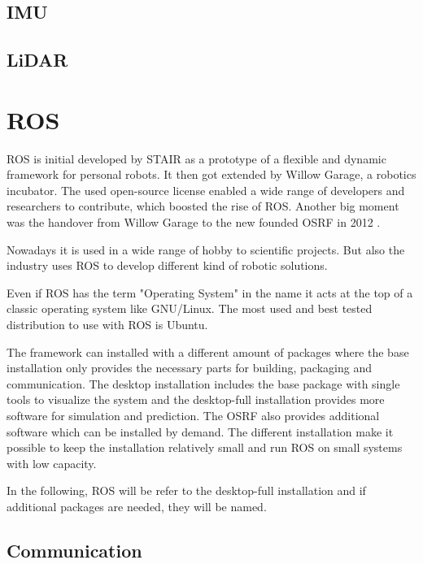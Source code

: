 	\subsection{IMU}\label{ssec:HWIMU}

	\subsection{LiDAR}\label{ssec:HWLiDAR}

\section{ROS}\label{sec:ros}
\ac{ROS} is initial developed by \ac{STAIR} as a prototype of a flexible and dynamic framework for personal robots.
It then got extended by Willow Garage, a robotics incubator.
The used open-source license enabled a wide range of developers and researchers to contribute, which boosted the rise of \ac{ROS}.
Another big moment was the handover from Willow Garage to the new founded \ac{OSRF} in 2012 \cite{rosHistory}.

Nowadays it is used in a wide range of hobby to scientific projects.
But also the industry uses \ac{ROS} to develop different kind of robotic solutions.

Even if \ac{ROS} has the term "Operating System" in the name it acts at the top of a classic operating system like GNU/Linux.
The most used and best tested distribution to use with \ac{ROS} is Ubuntu.

The framework can installed with a different amount of packages where the base installation only provides the necessary parts for building, packaging and communication.
The desktop installation includes the base package with single tools to visualize the system and the desktop-full installation provides more software for simulation and prediction.
The \ac{OSRF} also provides additional software which can be installed by demand.
The different installation make it possible to keep the installation relatively small and run \ac{ROS} on small systems with low capacity. 

In the following, \ac{ROS} will be refer to the desktop-full installation and if additional packages are needed, they will be named.

\subsection{Communication}\label{ssec:communication}

